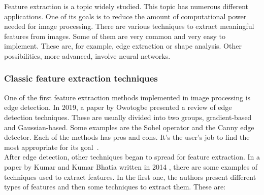 \documentclass[conference]{IEEEtran}
\begin{document}
		Feature extraction is a topic widely studied. 
		This topic has numerous different applications. 
		One of its goals is to reduce the amount of computational power needed for image processing. 
		There are various techniques to extract meaningful features from images. 
		Some of them are very common and very easy to implement. 
		These are, for example, edge extraction or shape analysis. 
		Other possibilities, more advanced, involve neural networks.\\

			\subsubsection{Classic feature extraction techniques}
				
				One of the first feature extraction methods implemented in image processing is edge detection.				
				In 2019, a paper by Owotogbe presented a review of edge detection techniques. 
				These are usually divided into two groups, gradient-based and Gaussian-based. 
				Some examples are the Sobel operator and the Canny edge detector. 
				Each of the methods has pros and cons. 
				It's the user's job to find the most appropriate for its goal~\cite{1}.\\
				
				After edge detection, other techniques began to spread for feature extraction. 
				In a paper by Kumar and Kumar Bhatia written in 2014 \cite{2}, 
				there are some examples of techniques used to extract features. 
				In the first one, the authors present different types of features and then some techniques to extract them. 
				These are:
\end{document}

